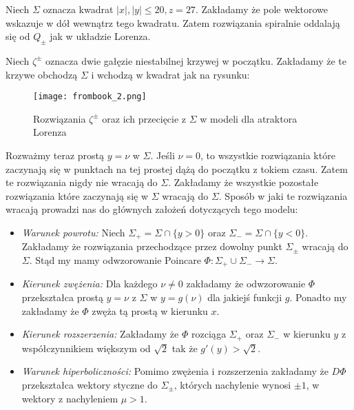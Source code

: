 \documentclass[12pt]{report}
\begin{document}
	\par Niech $\Sigma$ oznacza kwadrat $\lvert x \rvert, \lvert y \rvert \le 20, z = 27$. Zakładamy że pole wektorowe wskazuje w dół wewnątrz tego kwadratu. Zatem rozwiązania spiralnie oddalają się od $Q_{\pm}$ jak w układzie Lorenza.
	\par Niech $\zeta^{\pm}$ oznacza dwie gałęzie niestabilnej krzywej w początku. Zakładamy że te krzywe obchodzą $\Sigma$ i wchodzą w kwadrat jak na rysunku:
	\begin{figure}[H]
		\centering
		\texttt{[image: frombook\_2.png]}
		\caption{Rozwiązania $\zeta^{\pm}$ oraz ich przecięcie z $\Sigma$ w modeli dla atraktora Lorenza}
		\label{fig:frombook_2}
	\end{figure}
	\par Rozważmy teraz prostą $y = \nu$ w $\Sigma$. Jeśli $\nu = 0$, to wszystkie rozwiązania które zaczynają się w punktach na tej prostej dążą do początku z tokiem czasu. Zatem te rozwiązania nigdy nie wracają do $\Sigma$. Zakładamy że wszystkie pozostałe rozwiązania które zaczynają się w $\Sigma$ wracają do $\Sigma$. Sposób w jaki te rozwiązania wracają prowadzi nas do głównych założeń dotyczących tego modelu:
	\begin{itemize}
		\item \textit{Warunek powrotu:} Niech $\Sigma_+ = \Sigma \cap \{y > 0\}$ oraz $\Sigma_- = \Sigma \cap \{y < 0\}$. Zakładamy że rozwiązania przechodzące przez dowolny punkt $\Sigma_{\pm}$ wracają do $\Sigma$. Stąd my mamy odwzorowanie Poincare $\Phi: \Sigma_+ \cup \Sigma_- \to \Sigma$.
		\item \textit{Kierunek zwężenia:} Dla każdego $\nu \ne 0$ zakładamy że odwzorowanie $\Phi$ przekształca prostą $y = \nu$ z $\Sigma$ w $y = g(\nu)$ dla jakiejś funkcji $g$. Ponadto my zakładamy że $\Phi$ zwęża tą prostą w kierunku $x$.
		\item \textit{Kierunek rozszerzenia:} Zakładamy że $\Phi$ rozciąga $\Sigma_+$ oraz $\Sigma_-$ w kierunku $y$ z współczynnikiem większym od $\sqrt{2}$ tak że $g'(y) > \sqrt{2}$.
		\item \textit{Warunek hiperboliczności:} Pomimo zwężenia i rozszerzenia zakładamy że $D\Phi$ przekształca wektory styczne do $\Sigma_{\pm}$, których nachylenie wynosi $\pm 1$, w wektory z nachyleniem $\mu > 1$.
	\end{itemize}
\end{document}
